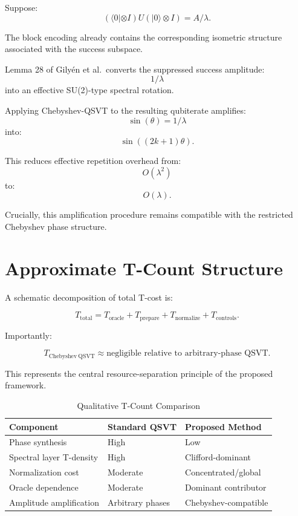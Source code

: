 \documentclass[12pt,a4paper]{article}
\begin{document}
Suppose:
\[
(\langle 0|\otimes I)
U
(|0\rangle\otimes I)
=
A/\lambda.
\]

The block encoding already contains the corresponding isometric structure associated with the success subspace.

Lemma 28 of Gily\'en et al.\ converts the suppressed success amplitude:
\[
1/\lambda
\]
into an effective SU(2)-type spectral rotation.

Applying Chebyshev-QSVT to the resulting qubiterate amplifies:
\[
\sin(\theta)
=
1/\lambda
\]
into:
\[
\sin((2k+1)\theta).
\]

This reduces effective repetition overhead from:
\[
O(\lambda^2)
\]
to:
\[
O(\lambda).
\]

Crucially, this amplification procedure remains compatible with the restricted Chebyshev phase structure.


\section{Approximate T-Count Structure}

A schematic decomposition of total T-cost is:

\[
T_{\mathrm{total}}
=
T_{\mathrm{oracle}}
+
T_{\mathrm{prepare}}
+
T_{\mathrm{normalize}}
+
T_{\mathrm{controls}}.
\]

Importantly:

\[
T_{\mathrm{Chebyshev\ QSVT}}
\approx
\text{negligible relative to arbitrary-phase QSVT}.
\]

This represents the central resource-separation principle of the proposed framework.

\begin{table}[h]
\centering
\caption{Qualitative T-Count Comparison}
\label{tab:tcount}
\begin{tabular}{lll}
\toprule
\textbf{Component} & \textbf{Standard QSVT} & \textbf{Proposed Method} \\
\midrule
Phase synthesis & High & Low \\
Spectral layer T-density & High & Clifford-dominant \\
Normalization cost & Moderate & Concentrated/global \\
Oracle dependence & Moderate & Dominant contributor \\
Amplitude amplification & Arbitrary phases & Chebyshev-compatible \\
\bottomrule
\end{tabular}
\end{table}
\end{document}
